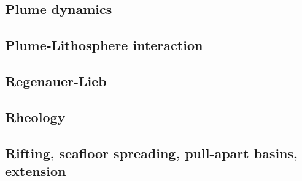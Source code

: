 \cite{zieg92a}
\cite{zhgm98}
\cite{lizh09}
\cite{huss12}
\cite{yoha15}

\subsection*{Plume dynamics}

\cite{nasf94}\cite{hayu94}
\cite{lays99}
\cite{isst06}
\cite{toyu11}\cite{talz11}
\cite{dagm13}
\cite{daso15}
\cite{dacc18}

\subsection*{Plume-Lithosphere interaction}

\cite{rich94}

\subsection*{Regenauer-Lieb}

\cite{reyu00}
\cite{reyu03}
\cite{reyu04}
\cite{rehy06}\cite{rewr06}
\cite{rerw08}
\cite{reps09}
\cite{revp13}

\subsection*{Rheology}

\cite{druc51}
\cite{hafn51}
\cite{drpr52}
\cite{hand69}
\cite{delo81}
\cite{rafi84}
\cite{wica90}
\cite{wasd96}
\cite{rydr00}\cite{rana00}
\cite{lova01}
\cite{hirt02}
\cite{hiko03}
\cite{didr05}\cite{drur05}
\cite{rygw06}
\cite{hirw07}
\cite{lemm08}
\cite{lell11}
\cite{reyn12}
\cite{lepo13}


\subsection*{Rifting, seafloor spreading, pull-apart basins, extension}

\cite{hoen86b}
\cite{trbr91}
\cite{zieg92b}
\cite{dusa96}
\cite{rafm98}
\cite{hupc01}
\cite{hube02}\cite{hani02}\cite{dabm02}
\cite{hube03}\cite{hani03}
\cite{hier04}
\cite{hubb05}
\cite{tibs06}
\cite{huha07}
\cite{agcz09}
\cite{aubh10}
\cite{alht11}
\cite{alht12}
\cite{alhf13}
\cite{hebr14}\cite{lige14}
\cite{nabu15}
\cite{olbm16}\cite{jekm16}
\cite{lemh17}
\cite{lisp19}

